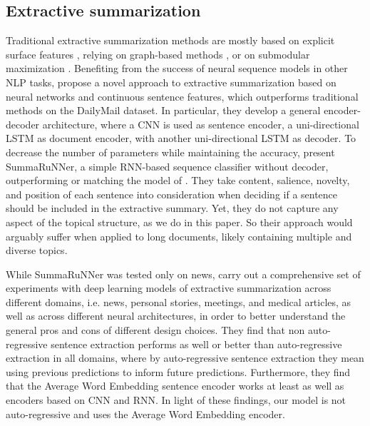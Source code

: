 \subsection{Extractive summarization}
Traditional extractive summarization methods are mostly based on explicit surface features \cite{feature_based}, relying on graph-based methods \cite{textrank}, or on submodular maximization \cite{tixier17}. Benefiting from the success of neural sequence models in other NLP tasks,  propose a novel approach to extractive summarization based on neural networks and continuous sentence features, which outperforms traditional methods on the DailyMail dataset. In particular, they develop a general encoder-decoder architecture, where a CNN is used as sentence encoder, a uni-directional LSTM as document encoder, with another uni-directional LSTM as decoder. To decrease the number of parameters while maintaining the accuracy,  present SummaRuNNer, a simple RNN-based sequence classifier without decoder, outperforming or matching the model of \cite{cheng&lapata}. They take content, salience, novelty, and position of each sentence into consideration when deciding if a sentence should be included in the extractive summary. Yet, they do not capture any aspect of the topical structure, as we do in this paper. So their approach would arguably suffer when  applied to long documents, likely containing multiple and diverse topics.

While SummaRuNNer was tested only on news,   carry out  a comprehensive set of experiments with deep learning models of extractive summarization across different domains, i.e. news, personal stories, meetings, and medical articles, as well as across different neural architectures, in order to better understand the general pros and cons of different design choices. They find that non auto-regressive sentence extraction performs as well or better than auto-regressive extraction in all domains, where by auto-regressive sentence extraction they mean using previous predictions to inform future predictions. Furthermore, they find that the Average Word Embedding sentence encoder works at least as well as encoders based on CNN and RNN. In light of these findings, our model is  not auto-regressive and uses the Average Word Embedding encoder.
